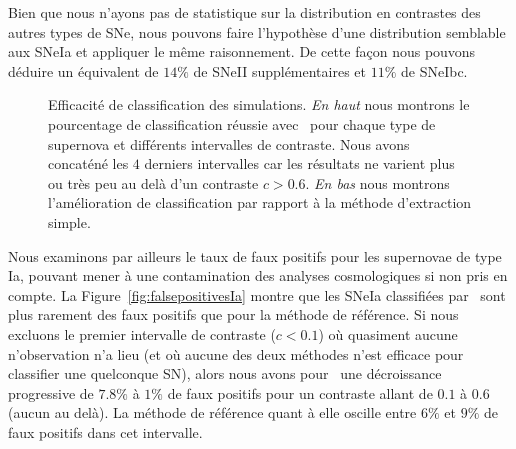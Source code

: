 \documentclass[../main/main.tex]{subfiles}
\begin{document}
Bien que nous n'ayons pas de statistique sur la distribution en contrastes des autres
types de SNe, nous pouvons faire l'hypothèse d'une distribution
semblable aux SNeIa et appliquer le même raisonnement. De cette façon
nous pouvons déduire un équivalent de $14\%$ de SNeII supplémentaires
et $11\%$ de SNeIbc.

\begin{figure}[ht]
  \centering
  \caption[Efficacité de classification des simulations.]{Efficacité de
    classification des simulations. \emph{En haut} nous montrons le pourcentage
  de classification réussie avec \hypergal\ pour chaque type de
  supernova et différents intervalles de contraste. Nous avons concaténé les $4$
  derniers intervalles car les résultats ne varient plus ou très
  peu au delà d'un contraste $c>0.6$. \emph{En bas} nous montrons
  l'amélioration de classification par rapport à la méthode d'extraction
simple. }
  \label{fig:typingimprove_snr}
\end{figure}

Nous examinons par ailleurs le taux de faux positifs pour les supernovae
de type Ia, pouvant mener à une contamination des analyses cosmologiques
si non pris en compte. La Figure~\ref{fig:falsepositivesIa} montre que
les SNeIa classifiées par \hypergal\ sont plus
rarement des faux positifs que pour la méthode de référence. Si nous
excluons le premier intervalle de contraste ($c<0.1$) où quasiment
aucune n'observation n'a lieu (et où aucune des deux
méthodes n'est efficace pour classifier une quelconque SN), alors nous
avons pour \hypergal\ une décroissance progressive de $7.8\%$ à $1\%$ de
faux positifs pour un contraste allant de $0.1$ à $0.6$ (aucun au delà).
La méthode de référence quant à elle oscille entre $6\%$ et $9\%$ de
faux positifs dans cet intervalle.
\end{document}
